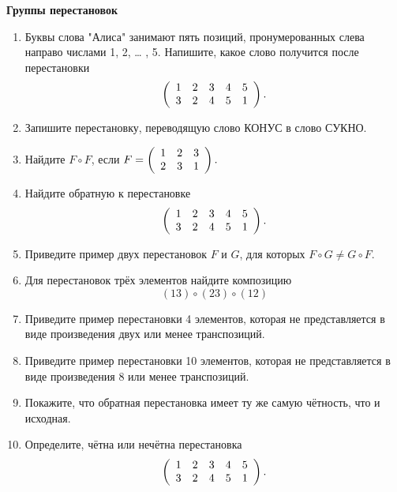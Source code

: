 \documentclass{article}
\begin{document}
\large
	

\begin{center}
\textbf{Группы перестановок}
\end{center}

\begin{enumerate}[label*=\protect\fbox{\arabic{enumi}}]

\item Буквы слова "Алиса" занимают пять позиций, пронумерованных
слева направо числами 1, 2, … , 5. Напишите, какое слово получится после
перестановки
$$\left(
\begin{array}{c c c c c}
	1 & 2 & 3 & 4 & 5 \\
	3 & 2 & 4 & 5 & 1 
\end{array}
\right).$$

\item Запишите перестановку, переводящую слово КОНУС в слово СУКНО.

\item Найдите $F \circ F$, если $F = \left(
\begin{array}{c c c}
	1 & 2 & 3  \\
	2 & 3 & 1
\end{array}
\right).$

\item Найдите обратную к перестановке 
$$\left(
\begin{array}{c c c c c}
	1 & 2 & 3 & 4 & 5 \\
	3 & 2 & 4 & 5 & 1 
\end{array}
\right).$$

\item Приведите пример двух перестановок $F$ и $G$, для которых $F \circ G \neq G \circ F$.

\item Для перестановок трёх элементов найдите композицию $$(13) \circ (23) \circ (12)$$

\item Приведите пример перестановки 4 элементов, которая не представляется в виде произведения двух или менее транспозиций.

\item Приведите пример перестановки 10 элементов, которая не представляется в виде произведения 8 или менее транспозиций.

\item Покажите, что обратная перестановка имеет ту же самую чётность, что и исходная.

\item Определите, чётна или нечётна перестановка
$$\left(
\begin{array}{c c c c c}
	1 & 2 & 3 & 4 & 5 \\
	3 & 2 & 4 & 5 & 1 
\end{array}
\right).$$


\end{enumerate}
\end{document}
